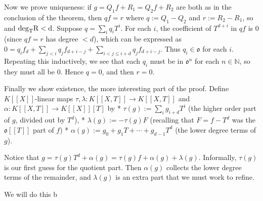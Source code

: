 Now we prove uniqueness: if $g=Q_1f+R_1=Q_2f+R_2$ are both as in the conclusion of the theorem, then $qf=r$ where $q:=Q_1-Q_2$ and $r:=R_2-R_1$, so and $\rm{deg}_TR<d$. Suppose $q=\sum_i q_i T^i$. For each $i$, the coefficient of $T^{d+i}$ in $qf$ is 0 (since $qf=r$ has degree $<d$), which can be expressed as $0=q_if_d+\sum_{j<i}q_jf_{d+i-j}+\sum_{i<j\le i+d}q_jf_{d+i-j}$. Thus $q_i\in \mathfrak{o}$ for each $i$. Repeating this inductively, we see that each $q_i$ must be in $\mathfrak{o}^n$ for each $n\in \mathbb{N}$, so they must all be $0$. Hence $q=0$, and then $r=0$.

Finally we show existence, the more interesting part of the proof. Define $K[[X]]$-linear maps $\tau,\lambda:K[[X,T]]\rightarrow K[[X,T]]$ and $\alpha:K[[X,T]]\rightarrow K[[X]][T]$ by 
* $\tau(g):=\sum_i g_{i+d} T^i$ (the higher order part of $g$, divided out by $T^d$),
* $\lambda(g):=-\tau(g)F$ (recalling that $F=f-T^d$ was the $\mathfrak{o}[[T]]$ part of $f$)
* $\alpha(g):=g_0+g_1T+\cdots+g_{d-1}T^d$ (the lower degree terms of $g$).

Notice that $g=\tau(g)T^d+\alpha(g)=\tau(g)f+\alpha(g)+\lambda(g)$. Informally, $\tau(g)$ is our first guess for the quotient part. Then $\alpha(g)$ collects the lower degree terms of the remainder, and $\lambda(g)$ is an extra part that we must work to refine. 

We will do this b
